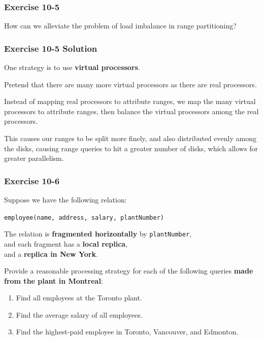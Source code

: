 \begin{frame}
\frametitle{Exercise 10-5}

How can we alleviate the problem of load imbalance in range partitioning?

\end{frame}


\begin{frame}
\frametitle{Exercise 10-5 Solution}

One strategy is to use \textbf{virtual processors}.

Pretend that there are many more virtual processors as there are real processors.

Instead of mapping real processors to attribute ranges, we map the many virtual processors to attribute ranges, then balance the virtual processors among the real processors.

This causes our ranges to be split more finely, and also distributed evenly among the disks, causing range queries to hit a greater number of disks, which allows for greater parallelism.

\end{frame}


\begin{frame}
\frametitle{Exercise 10-6}

Suppose we have the following relation: \\
\begin{center}
  \texttt{employee(name, address, salary, plantNumber)}
\end{center}

The relation is \textbf{fragmented horizontally} by \texttt{plantNumber}, \\
and each fragment has a \textbf{local replica}, \\
and a \textbf{replica in New York}.

Provide a reasonable processing strategy for each of the following queries \textbf{made from the plant in Montreal}:

\begin{enumerate}
  \item Find all employees at the Toronto plant.
  \item Find the average salary of all employees.
  \item Find the highest-paid employee in Toronto, Vancouver, and Edmonton.
\end{enumerate}

\end{frame}


